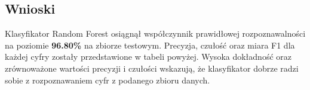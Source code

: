 \documentclass{article}
\begin{document}
\subsection{Wnioski}

Klasyfikator Random Forest osiągnął współczynnik prawidłowej rozpoznawalności na poziomie \textbf{96.80\%} na zbiorze testowym. Precyzja, czułość oraz miara F1 dla każdej cyfry zostały przedstawione w tabeli powyżej. Wysoka dokładność oraz zrównoważone wartości precyzji i czułości wskazują, że klasyfikator dobrze radzi sobie z rozpoznawaniem cyfr z podanego zbioru danych.
\end{document}
